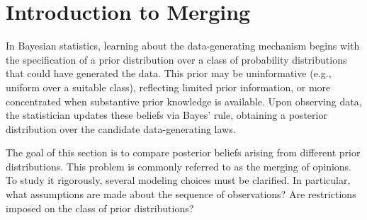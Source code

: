\section{Introduction to Merging}\label{section:merging_introduction}

In Bayesian statistics, learning about the data-generating mechanism begins with the specification of a prior distribution over a class of probability distributions that could have generated the data. This prior may be uninformative (e.g., uniform over a suitable class), reflecting limited prior information, or more concentrated when substantive prior knowledge is available. Upon observing data, the statistician updates these beliefs via Bayes' rule, obtaining a posterior distribution over the candidate data-generating laws.

The goal of this section is to compare posterior beliefs arising from different prior distributions. This problem is commonly referred to as the merging of opinions. To study it rigorously, several modeling choices must be clarified. In particular, what assumptions are made about the sequence of observations? Are restrictions imposed on the class of prior distributions?


